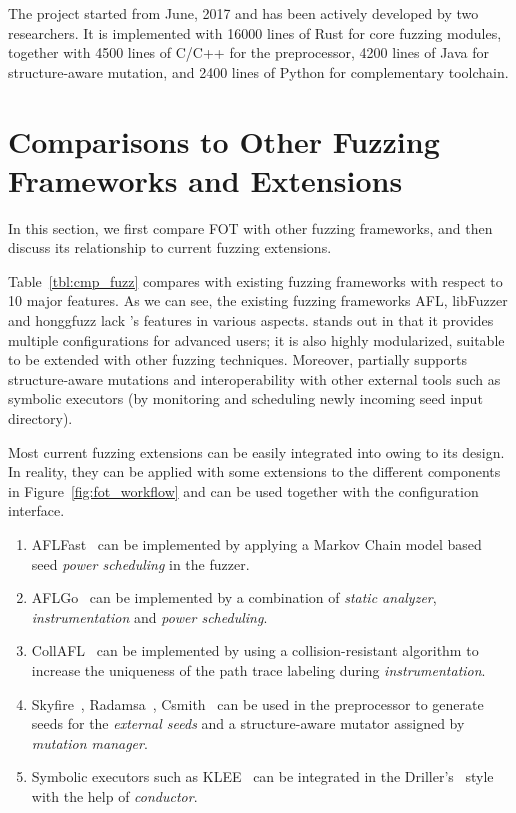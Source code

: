 The {\FOT} project started from June, 2017 and has been actively developed by two researchers. It is implemented with 16000 lines of Rust for core fuzzing modules, together with 4500 lines of C/C++ for the preprocessor, 4200 lines of Java for structure-aware mutation, and 2400 lines of Python for complementary toolchain.
  

\section{Comparisons to Other Fuzzing Frameworks and Extensions}


In this section, we first compare FOT with other fuzzing frameworks, and then discuss its relationship to current fuzzing extensions.



Table~\ref{tbl:cmp_fuzz} compares {\FOT} with existing fuzzing frameworks with respect to 10 major features. As we can see, the existing fuzzing frameworks AFL, libFuzzer and honggfuzz lack \FOT's features in various aspects. {\FOT} stands out in that it provides multiple configurations for advanced users; it is also highly modularized, suitable to be extended with other fuzzing techniques. Moreover, {\FOT} partially supports structure-aware mutations and interoperability with other external tools such as symbolic executors (by monitoring and scheduling newly incoming seed input directory).

Most current fuzzing extensions can be easily integrated into {\FOT} owing to its design. In reality, they can be applied with some extensions to the different components in Figure~\ref{fig:fot_workflow} and can be used together with the configuration interface. 

\begin{enumerate}[1)]
	\item AFLFast~\cite{Bohme:2016:CGF} can be implemented by applying a Markov Chain model based seed \emph{power scheduling} in the fuzzer. 
	\item AFLGo~\cite{Bohme:2017:DGF} can be implemented by a combination of \emph{static analyzer}, \emph{instrumentation} and \emph{power scheduling}.
	\item CollAFL~\cite{CollAFL} can be implemented by using a collision-resistant algorithm to increase the uniqueness of the path trace labeling during \emph{instrumentation}.
	\item Skyfire~\cite{junjie:2017sp:skyfire}, Radamsa~\cite{radamsa}, Csmith~\cite{csmith} can be used in the preprocessor to generate seeds for the \emph{external seeds} and a structure-aware mutator assigned by \emph{mutation manager}.
	\item Symbolic executors such as KLEE~\cite{klee} can be integrated in the Driller's~\cite{driller} style with the help of \emph{conductor}.
\end{enumerate}

